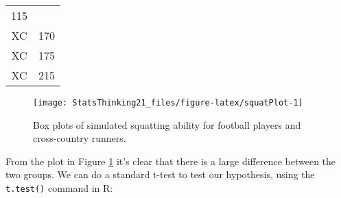 \documentclass[]{book}
\newenvironment{Shaded}{\begin{snugshade}}{\end{snugshade}}
\newcommand{\KeywordTok}[1]{\textcolor[rgb]{0.13,0.29,0.53}{\textbf{#1}}}
\newcommand{\DataTypeTok}[1]{\textcolor[rgb]{0.13,0.29,0.53}{#1}}
\newcommand{\StringTok}[1]{\textcolor[rgb]{0.31,0.60,0.02}{#1}}
\newcommand{\CommentTok}[1]{\textcolor[rgb]{0.56,0.35,0.01}{\textit{#1}}}
\newcommand{\OtherTok}[1]{\textcolor[rgb]{0.56,0.35,0.01}{#1}}
\newcommand{\OperatorTok}[1]{\textcolor[rgb]{0.81,0.36,0.00}{\textbf{#1}}}
\newcommand{\NormalTok}[1]{#1}
\theoremstyle{definition}
\theoremstyle{definition}
\theoremstyle{definition}
\theoremstyle{remark}
\begin{document}
\begin{longtable}[]{@{}cc@{}}
\begin{minipage}[t]{0.10\columnwidth}
115\strut
\end{minipage}\tabularnewline
\begin{minipage}[t]{0.10\columnwidth}\centering\strut
XC\strut
\end{minipage} & \begin{minipage}[t]{0.10\columnwidth}\centering\strut
170\strut
\end{minipage}\tabularnewline
\begin{minipage}[t]{0.10\columnwidth}\centering\strut
XC\strut
\end{minipage} & \begin{minipage}[t]{0.10\columnwidth}\centering\strut
175\strut
\end{minipage}\tabularnewline
\begin{minipage}[t]{0.10\columnwidth}\centering\strut
XC\strut
\end{minipage} & \begin{minipage}[t]{0.10\columnwidth}\centering\strut
215\strut
\end{minipage}\tabularnewline
\bottomrule
\end{longtable}

\begin{figure}
\texttt{[image: StatsThinking21\_files/figure-latex/squatPlot-1]} \caption{Box plots of simulated squatting ability for football players and cross-country runners.}\label{fig:squatPlot}
\end{figure}

From the plot in Figure \ref{fig:squatPlot} it's clear that there is a
large difference between the two groups. We can do a standard t-test to
test our hypothesis, using the \texttt{t.test()} command in R:

\begin{Shaded}
\end{Shaded}
\end{document}
